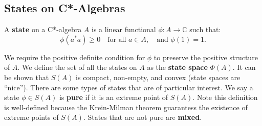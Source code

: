 \subsection{States on C*-Algebras}
\begin{definition}
A \textbf{state} on a C*-algebra \( A \) is a linear functional \( \phi: A \to \mathbb{C} \) such that:
\[
\phi(a^*a) \geq 0 \quad \text{for all } a \in A, \quad \text{and } \phi(1) = 1.
\]
\end{definition}


We require the positive definite condition for $\phi$ to preserve the positive structure
of $A$. We define the set of all the states on $A$ as the \textbf{state space} $\Phi(A)$. It
can be shown that $S(A)$ is compact, non-empty, and convex (state spaces are ``nice'').
There are some types of states that are of particular interest. 
We say a state $\phi \in S(A)$ is \textbf{pure} if it is an extreme point of $S(A)$.
Note this definition is well-defined because the Krein-Milman theorem guarantess
the existence of extreme points of $S(A)$. States that are not pure are \textbf{mixed}.

